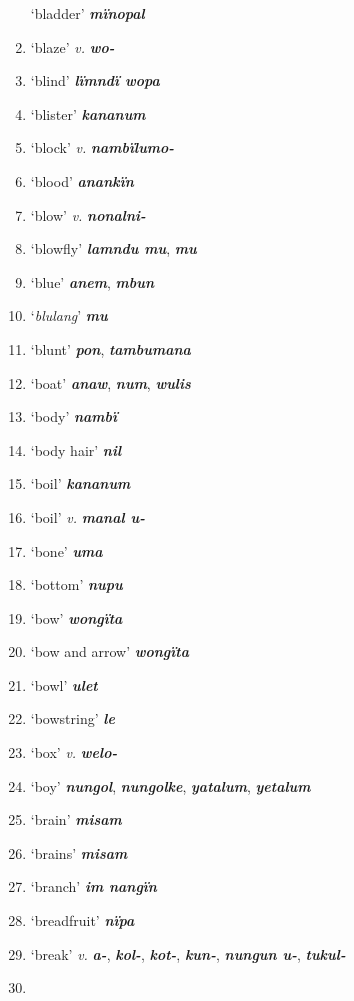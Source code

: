 \begin{enumerate}[noitemsep, label={}, align=left, widest=190, labelsep=1ex,leftmargin=*,itemindent=-10pt]
‘bladder’ \textbf{\textit{mïnopal}} \item
‘blaze’ \textit{v.} \textbf{\textit{wo-}} \item
‘blind’ \textbf{\textit{lïmndï wopa}} \item
‘blister’ \textbf{\textit{kananum}} \item
‘block’ \textit{v.} \textbf{\textit{nambïlumo-}} \item
‘blood’ \textbf{\textit{anankïn}} \item
‘blow’ \textit{v.} \textbf{\textit{nonalni-}} \item
‘blowfly’ \textbf{\textit{lamndu mu}}, \textbf{\textit{mu}} \item
‘blue’ \textbf{\textit{anem}}, \textbf{\textit{mbun}} \item
‘\textit{blulang}’ \textbf{\textit{mu}} \item
‘blunt’ \textbf{\textit{pon}}, \textbf{\textit{tambumana}} \item
‘boat’ \textbf{\textit{anaw}}, \textbf{\textit{num}}, \textbf{\textit{wulis}} \item
‘body’ \textbf{\textit{nambï}} \item
‘body hair’ \textbf{\textit{nil}} \item
‘boil’ \textbf{\textit{kananum}} \item
‘boil’ \textit{v.} \textbf{\textit{manal u-}} \item
‘bone’ \textbf{\textit{uma}} \item
‘bottom’ \textbf{\textit{nupu}} \item
‘bow’ \textbf{\textit{wongïta}} \item
‘bow and arrow’ \textbf{\textit{wongïta}} \item
‘bowl’ \textbf{\textit{ulet}} \item
‘bowstring’ \textbf{\textit{le}} \item
‘box’ \textit{v.} \textbf{\textit{welo-}} \item
‘boy’ \textbf{\textit{nungol}}, \textbf{\textit{nungolke}}, \textbf{\textit{yatalum}}, \textbf{\textit{yetalum}} \item
‘brain’ \textbf{\textit{misam}} \item
‘brains’ \textbf{\textit{misam}} \item
‘branch’ \textbf{\textit{im nangïn}} \item
‘breadfruit’ \textbf{\textit{nïpa}} \item
‘break’ \textit{v.} \textbf{\textit{a-}}, \textbf{\textit{kol-}}, \textbf{\textit{kot-}}, \textbf{\textit{kun-}}, \textbf{\textit{nungun u-}}, \textbf{\textit{tukul-}} \item

\end{enumerate}
